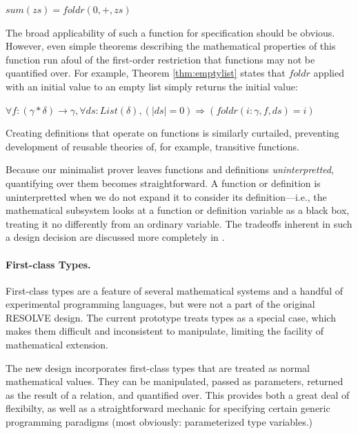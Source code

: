 $sum(zs) = foldr(0, +, zs)$

The broad applicability of such a function for specification should be obvious.  However, even simple theorems describing the mathematical properties of this function run afoul of the first-order restriction that functions may not be quantified over.  For example, Theorem \ref{thm:emptylist} states that $foldr$ applied with an initial value to an empty list simply returns the initial value:

\begin{thm}
$\forall f : (\gamma*\delta)\rightarrow\gamma, \forall ds : List(\delta), (|ds| = 0) \Rightarrow (foldr(i : \gamma, f, ds) = i)$
\label{thm:emptylist}
\end{thm}

Creating definitions that operate on functions is similarly curtailed, preventing development of reusable theories of, for example, transitive functions.

Because our minimalist prover leaves functions and definitions \emph{uninterpretted}, quantifying over them becomes straightforward.  A function or definition is uninterpretted when we do not expand it to consider its definition---i.e., the mathematical subsystem looks at a function or definition variable as a black box, treating it no differently from an ordinary variable.  The tradeoffs inherent in such a design decision are discussed more completely in \cite{tagoreExpand}.

\paragraph{First-class Types.}\label{sec:firstClassTypes}
First-class types are a feature of several mathematical systems and a handful of experimental programming languages, but were not a part of the original RESOLVE design.  The current prototype treats types as a special case, which makes them difficult and inconsistent to manipulate, limiting the facility of mathematical extension.

The new design incorporates first-class types that are treated as normal mathematical values.  They can be manipulated, passed as parameters, returned as the result of a relation, and quantified over.  This provides both a great deal of flexibilty, as well as a straightforward mechanic for specifying certain generic programming paradigms (most obviously: parameterized type variables.)


